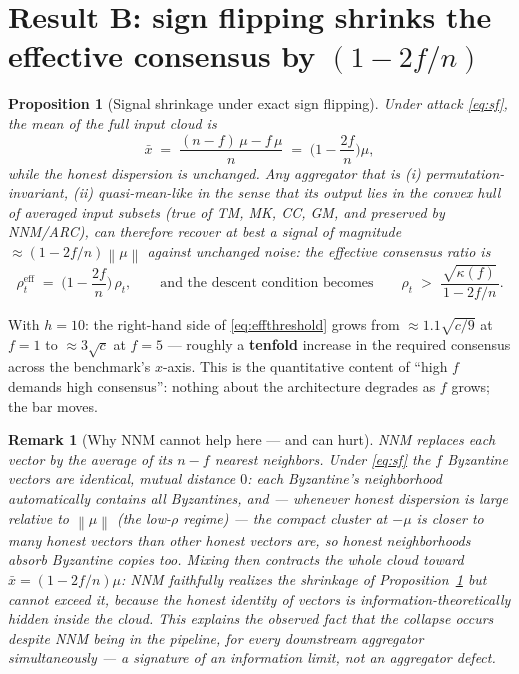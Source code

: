 \documentclass[11pt]{article}
\newtheorem{proposition}{Proposition}
\newtheorem{remark}{Remark}
\newcommand{\norm}[1]{\left\lVert #1 \right\rVert}
\begin{document}
\section{Result B: sign flipping shrinks the effective consensus by $(1-2f/n)$}

\begin{proposition}[Signal shrinkage under exact sign flipping]
\label{prop:shrink}
Under attack \eqref{eq:sf}, the mean of the full input cloud is
\begin{equation}
\bar x \;=\; \frac{(n-f)\,\mu - f\,\mu}{n} \;=\; \Big(1 - \frac{2f}{n}\Big)\mu ,
\end{equation}
while the honest dispersion is unchanged. Any aggregator that is
(i) permutation-invariant, (ii) quasi-mean-like in the sense that its output
lies in the convex hull of averaged input subsets (true of TM, MK, CC, GM, and
preserved by NNM/ARC), can therefore recover at best a signal of magnitude
$\approx (1 - 2f/n)\norm{\mu}$ against unchanged noise: the \emph{effective}
consensus ratio is
\begin{equation}
\rho^{\mathrm{eff}}_t \;=\; \Big(1-\frac{2f}{n}\Big)\,\rho_t ,
\qquad\text{and the descent condition becomes}\qquad
\rho_t \;>\; \frac{\sqrt{\kappa(f)}}{\,1 - 2f/n\,} .
\label{eq:effthreshold}
\end{equation}
\end{proposition}

With $h = 10$: the right-hand side of \eqref{eq:effthreshold} grows from
$\approx 1.1\sqrt{c/9}$ at $f{=}1$ to $\approx 3\sqrt{c}$ at $f{=}5$ ---
roughly a \textbf{tenfold} increase in the required consensus across the
benchmark's $x$-axis. This is the quantitative content of ``high $f$ demands
high consensus'': nothing about the architecture degrades as $f$ grows; the
bar moves.

\begin{remark}[Why NNM cannot help here --- and can hurt]
NNM replaces each vector by the average of its $n-f$ nearest neighbors. Under
\eqref{eq:sf} the $f$ Byzantine vectors are \emph{identical}, mutual distance
$0$: each Byzantine's neighborhood automatically contains all Byzantines, and
--- whenever honest dispersion is large relative to $\norm{\mu}$ (the low-$\rho$
regime) --- the compact cluster at $-\mu$ is closer to many honest vectors than
other honest vectors are, so honest neighborhoods absorb Byzantine copies too.
Mixing then contracts the whole cloud toward $\bar x = (1-2f/n)\mu$: NNM
faithfully realizes the shrinkage of Proposition~\ref{prop:shrink} but cannot
exceed it, because the honest identity of vectors is information-theoretically
hidden inside the cloud. This explains the observed fact that the collapse
occurs \emph{despite} NNM being in the pipeline, for every downstream
aggregator simultaneously --- a signature of an information limit, not an
aggregator defect.
\end{remark}
\end{document}
